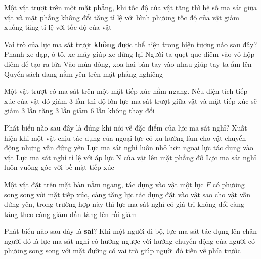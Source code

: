 \begin{ex}%
Một vật trượt trên một mặt phẳng, khi tốc độ của vật tăng thì hệ số ma sát giữa vật và mặt phẳng
\choice
{\True không đổi}
{tăng tỉ lệ với bình phương tốc độ của vật}
{giảm xuống}
{tăng tỉ lệ với tốc độ của vật}
 \end{ex}
\begin{ex}%
Vai trò của lực ma sát trượt \textbf{không} được thể hiện trong hiện tượng nào sau đây?
\choice
{Phanh xe đạp, ô tô, xe máy giúp xe dừng lại}
{Người ta quẹt que diêm vào vỏ hộp diêm để tạo ra lửa}
{Vào mùa đông, xoa hai bàn tay vào nhau giúp tay ta ấm lên}
{\True Quyển sách đang nằm yên trên mặt phẳng nghiêng}
 \end{ex}
\begin{ex}%
Một vật trượt có ma sát trên một mặt tiếp xúc nằm ngang. Nếu diện tích tiếp xúc của vật đó giảm $3$ lần thì độ lớn lực ma sát trượt giữa vật và mặt tiếp xúc sẽ
\choice
{giảm $3$ lần}
{tăng $3$ lần}
{giảm $6$ lần}
{\True không thay đổi}
 \end{ex}
\begin{ex}%
Phát biểu nào sau đây là đúng khi nói về đặc điểm của lực ma sát nghỉ?
\choice
{\True Xuất hiện khi một vật chịu tác dụng của ngoại lực có xu hướng làm cho vật chuyển động nhưng vẫn đứng yên}
{Lực ma sát nghỉ luôn nhỏ hơn ngoại lực tác dụng vào vật}
{Lực ma sát nghỉ tỉ lệ với áp lực N của vật lên mặt phẳng đỡ}
{Lực ma sát nghỉ luôn vuông góc với bề mặt tiếp xúc}
 \end{ex}
\begin{ex}%
Một vật đặt trên mặt bàn nằm ngang, tác dụng vào vật một lực $F$ có phương song song với mặt tiếp xúc, càng tăng lực tác dụng đặt vào vật sao cho vật vẫn đứng yên, trong trường hợp này thì lực ma sát nghỉ có giá trị
\choice
{không đổi}
{\True càng tăng theo}
{càng giảm dần}
{tăng lên rồi giảm}
 \end{ex}
\begin{ex}%
Phát biểu nào sau đây là \textbf{sai}? Khi một người đi bộ, lực ma sát tác dụng lên chân người đó
\choice
{là lực ma sát nghỉ}
{\True có hướng ngược với hướng chuyển động của người}
{có phương song song với mặt đường}
{có vai trò giúp người đó tiến về phía trước}
 \end{ex}
